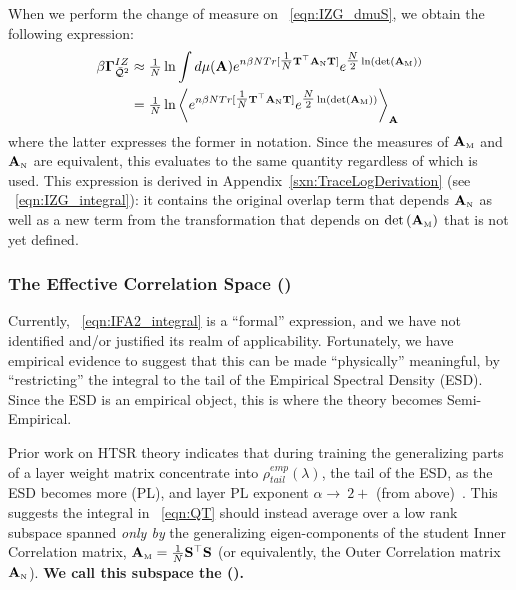 When we perform the change of measure on
\EQN~\ref{eqn:IZG_dmuS},
we obtain the following expression: %
\begin{align}
  \label{eqn:IFA2_integral}
  \nonumber 
  \beta\mathbf{\Gamma}^{IZ}_{\bar{\mathcal{Q}}^{2}} 
  &\approx 
    \tfrac{1}{N}
  \ln \int d\mu(\mathbf{A})
  e^{n\beta N Tr[\tfrac{1}{N}{\mathbf{T}}^{\top}{\mathbf{A}}_{\text{\tiny N}}{\mathbf{T}}] }
  e^{\tfrac{N}{2}\ln(\mbox{}{\text{det}}\left({\mathbf{A}}_{\text{\tiny M}}\right))} \\
  & = 
  \tfrac{1}{N}
  \ln
  \left\langle
  e^{n\beta N Tr[\tfrac{1}{N}{\mathbf{T}}^{\top}{\mathbf{A}}_{\text{\tiny N}}{\mathbf{T}}] }
  e^{\tfrac{N}{2}\ln(\mbox{}{\text{det}}\left({\mathbf{A}}_{\text{\tiny M}}\right))}
    \right\rangle_{\mathbf{A}}
\end{align}
where the latter expresses the former in \BraKet notation. Since the measures of ${\mathbf{A}}_{\text{\tiny M}}$ and ${\mathbf{A}}_{\text{\tiny N}}$ are equivalent, this evaluates to the same quantity regardless of which is used.
This expression is derived in Appendix~\ref{sxn:TraceLogDerivation} (see \EQN~\ref{eqn:IZG_integral}):
it contains the original overlap term that depends ${\mathbf{A}}_{\text{\tiny N}}$ as well as a new term from
the transformation that depends on $\mbox{}{\text{det}}\left({\mathbf{A}}_{\text{\tiny M}}\right)$ that is not yet defined.


\subsubsection{The Effective Correlation Space (\ECS)}

Currently, \EQN~\ref{eqn:IFA2_integral} is a ``formal'' expression, 
and we have not identified and/or justified its realm of applicability.
Fortunately, we have empirical evidence to suggest that this can be
made ``physically'' meaningful, by ``restricting'' the integral
to the tail of the Empirical Spectral Density (ESD). Since the ESD is an empirical object, this is where the theory becomes Semi-Empirical.

Prior work on HTSR theory indicates that during training the generalizing parts of a layer weight matrix concentrate
into $\rho_{tail}^{emp}(\lambda)$, the tail of the ESD, as the ESD becomes more \PowerLaw (PL),
and layer PL exponent  $\alpha\rightarrow\ 2+$ (from above)~\cite{MM19_HTSR_ICML,MM20_SDM,MM18_TR_JMLRversion,MM20a_trends_NatComm,YTHx23_KDD}. 
This suggests the integral in \EQN~\ref{eqn:QT}
should instead average over a low rank subspace spanned \emph{only by} the generalizing eigen-components of the
student Inner Correlation matrix, ${\mathbf{A}}_{\text{\tiny M}}=\tfrac{1}{N}{\mathbf{S}}^{\top}{\mathbf{S}}$
(or equivalently, the Outer Correlation matrix ${\mathbf{A}}_{\text{\tiny N}}$).
\textbf{We call this subspace the \EffectiveCorrelationSpace (\ECS).}


